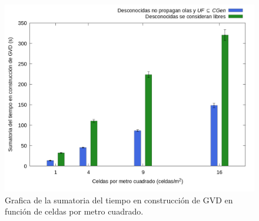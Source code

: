 \begin{figure}[H]
  \centerfloat

  \includegraphics[clip=true, width=\graphlen]{imagenes/graficas_chicas/graficas_histo_num/desconocido/gvd_construction_time_sum.png}

  \caption{Grafica de la sumatoria del tiempo en construcción de GVD en función de celdas por metro cuadrado.}\label{fig:gra:des:gvdt}

\end{figure}

